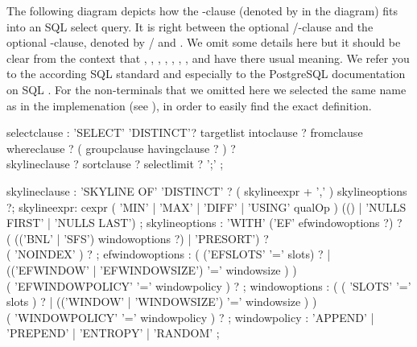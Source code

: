\railnontermfont{\rmfamily\itshape}
\railtermfont{\ttfamily\upshape\small}
\railboxheight 12pt
\railinit

The following diagram depicts how the -clause
(denoted by  in the diagram) fits into an SQL
select query.  It is right between the optional /-clause and the optional -clause, denoted by  /  and
. We omit some details here but it should be clear
from the context that , ,
, , ,
, , and  have
there usual meaning. We refer you to the according SQL standard and
especially to the PostgreSQL documentation on SQL
. For the non-terminals that we omitted
here we selected the same name as in the implemenation (see
), in order to easily find the exact definition.

%
\begin{rail}
selectclause :
    'SELECT' 'DISTINCT'? targetlist intoclause ? fromclause \\ 
    whereclause ? ( groupclause havingclause ? ) ? \\
    skylineclause ? sortclause ? selectlimit ? ';' ;
\end{rail}




\begin{rail}
skylineclause : 'SKYLINE OF' 'DISTINCT' ? ( skylineexpr + ',' ) skylineoptions ?;
skylineexpr: cexpr ( 'MIN' | 'MAX' | 'DIFF' | 'USING' qualOp ) (() | 'NULLS FIRST' | 'NULLS LAST') ;
skylineoptions : 'WITH' ('EF' efwindowoptions ?) ? \\ ( (('BNL' | 'SFS') windowoptions ?) | 'PRESORT') ? \\ ( 'NOINDEX' ) ? ;
efwindowoptions : ( ('EFSLOTS' '=' slots) ? | (('EFWINDOW' | 'EFWINDOWSIZE') '=' windowsize ) ) \\ ( 'EFWINDOWPOLICY' '=' windowpolicy ) ? ;
windowoptions : ( ( 'SLOTS' '=' slots ) ? | (('WINDOW' | 'WINDOWSIZE') '=' windowsize ) ) \\ ( 'WINDOWPOLICY' '=' windowpolicy ) ? ;
windowpolicy : 'APPEND' | 'PREPEND' | 'ENTROPY' | 'RANDOM' ;

\end{rail}


